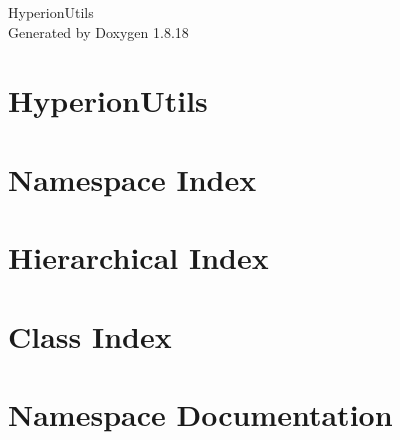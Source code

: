 \let\mypdfximage\pdfximage\def\pdfximage{\immediate\mypdfximage}\documentclass[twoside]{book}
\newcommand{\+}{\discretionary{\mbox{\scriptsize$\hookleftarrow$}}{}{}}
\newcommand{\clearemptydoublepage}{%
  \newpage{\pagestyle{empty}\cleardoublepage}%
}
\begin{document}
\hypersetup{pageanchor=false,
             bookmarksnumbered=true,
             pdfencoding=unicode
            }
\begin{titlepage}
\vspace*{7cm}
\begin{center}%
{\Large Hyperion\+Utils }\\
\vspace*{1cm}
{\large Generated by Doxygen 1.8.18}\\
\end{center}
\end{titlepage}
\clearemptydoublepage
{}
\tableofcontents
\clearemptydoublepage
{}
\hypersetup{pageanchor=true}

\chapter{Hyperion\+Utils}
\label{index}\hypertarget{index}{}
\chapter{Namespace Index}

\chapter{Hierarchical Index}

\chapter{Class Index}

\chapter{Namespace Documentation}




\end{document}

